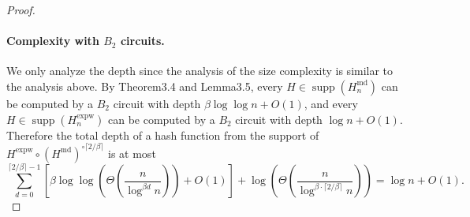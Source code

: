 \documentclass[10pt,a4paper]{article}
\begin{document}
\begin{proof}
\paragraph{Complexity with $B_2$ circuits.}
We only analyze the depth since the analysis of the size complexity is similar to the analysis above. By Theorem3.4 and Lemma3.5, every $H\in\operatorname{supp}(H_n^{\mathrm{md}})$ can be computed by a $B_2$ circuit with depth $\beta\log\log n+O(1)$, and every $H\in\operatorname{supp}(H_n^{\mathrm{expw}})$ can be computed by a $B_2$ circuit with depth $\log n+O(1)$. Therefore the total depth of a hash function from the support of $H^{\mathrm{expw}}\circ(H^{\mathrm{md}})^{\circ\lceil2/\beta\rceil}$ is at most
\[\sum_{d=0}^{\lceil2/\beta\rceil-1}\left[\beta\log\log\left(\Theta\left(\frac n{\log^{\beta d}n}\right)\right)+O(1)\right]+\log\left(\Theta\left(\frac n{\log^{\beta\cdot\lceil2/\beta\rceil}n}\right)\right)=\log n+O(1).\]
\end{proof}
\end{document}
